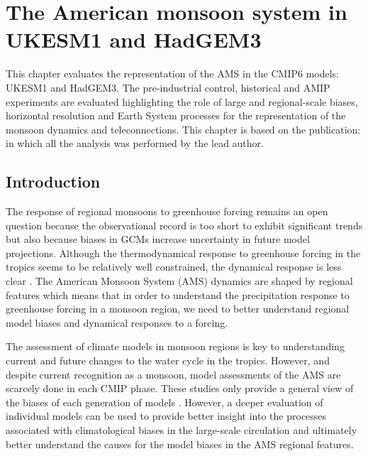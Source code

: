 \chapter{\label{ch:4-ams}The American monsoon system in UKESM1 and HadGEM3}


This chapter evaluates the representation of the AMS in the CMIP6 models: UKESM1 and HadGEM3. The pre-industrial control, historical and AMIP experiments are evaluated highlighting the role of large and regional-scale biases, horizontal resolution and Earth System processes for the representation of the monsoon dynamics and teleconnections.
This chapter is based on the publication: \cite{garciafranco2020} in which all the analysis was performed by the lead author. %




\section{Introduction}

The response of regional monsoons to greenhouse forcing remains an open question \citep{zhou2016,pascale2019} because the observational record is too short to exhibit significant trends but also because biases in GCMs increase uncertainty in future model projections.
Although the thermodynamical response to greenhouse forcing in the tropics seems to be relatively well constrained, the dynamical response is less clear \citep{shepherd2014}. The American Monsoon System (AMS) dynamics are shaped by regional features which means that in order to understand the  precipitation response to greenhouse forcing in a monsoon region, we need to better understand regional model biases and dynamical responses to a forcing. %

The assessment of climate models in monsoon regions is key to understanding current and future changes to the water cycle in the tropics. However, and despite current recognition as a monsoon, model assessments of the AMS are scarcely done in each CMIP phase.  These studies only provide a general view of the biases of each generation of models \citep[see e.g.][]{geil2013,ryu2014}. However, a deeper evaluation of individual models can be used to provide better insight into the processes associated with climatological biases in the large-scale circulation and ultimately better understand the causes for the model biases in the AMS regional features. 

